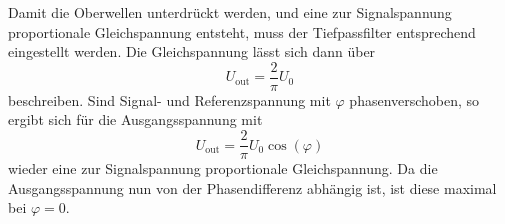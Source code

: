 Damit die Oberwellen unterdrückt werden, und eine zur Signalspannung proportionale
Gleichspannung entsteht, muss der Tiefpassfilter entsprechend eingestellt werden.
Die Gleichspannung lässt sich dann über
\begin{equation}
  U_\text{out}=\frac{2}{\pi}U_0
\end{equation}
beschreiben.
Sind Signal- und Referenzspannung mit $\varphi$ phasenverschoben, so ergibt sich für
die Ausgangsspannung mit
\begin{equation}
  U_\text{out}=\frac{2}{\pi}U_0\cos(\varphi) \label{eqn:out}
\end{equation}
wieder eine zur Signalspannung proportionale Gleichspannung. Da die Ausgangsspannung
nun von der Phasendifferenz abhängig ist, ist diese maximal bei $\varphi=0$.
